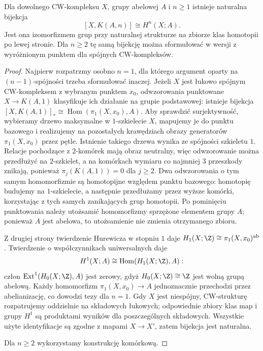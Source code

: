 \begin{twierdzenie}
\label{thm:rep-coho-v6}
Dla dowolnego CW-kompleksu $X$, grupy abelowej $A$ i
$n\ge1$ istnieje naturalna bijekcja
\[
[X,K(A,n)]\cong H^n(X;A).
\]
Jest ona izomorfizmem grup przy naturalnej strukturze
na zbiorze klas homotopii po lewej stronie.
Dla $n\ge2$ tę samą bijekcję można sformułować
w wersji z wyróżnionym punktem dla spójnych CW-kompleksów.
\end{twierdzenie}
\begin{proof}
Najpierw rozpatrzmy osobno $n=1$, dla którego argument
oparty na $(n-1)$-spójności trzeba sformułować inaczej.
Jeżeli $X$ jest łukowo spójnym CW-kompleksem z wybranym
punktem $x_0$, odwzorowania punktowane $X\to K(A,1)$ klasyfikuje
ich działanie na grupie podstawowej: istnieje bijekcja
$[X,K(A,1)]_*\cong\operatorname{Hom}(\pi_1(X,x_0),A)$.
Aby sprawdzić surjektywność, wybieramy drzewo maksymalne w $1$-szkielecie $X$,
mapujemy je do punktu bazowego i realizujemy na pozostałych
krawędziach obrazy generatorów $\pi_1(X,x_0)$ przez pętle.
Istnienie takiego drzewa wynika ze spójności szkieletu $1$.
Relacje pochodzące z $2$-komórek mają obraz neutralny,
więc odwzorowanie można przedłużyć na $2$-szkielet, a na
komórkach wymiaru co najmniej $3$ przeszkody znikają,
ponieważ $\pi_j(K(A,1))=0$ dla $j\ge2$. Dwa odwzorowania o tym
samym homomorfizmie są homotopijne względem punktu
bazowego: homotopię budujemy na $1$-szkielecie,
a następnie przedłużamy przez wyższe komórki,
korzystając z tych samych zanikających grup homotopii.
Po pominięciu punktowania należy utożsamić homomorfizmy
sprzężone elementem grupy $A$; ponieważ $A$ jest abelowa,
to utożsamienie nie zmienia otrzymanego zbioru.

Z drugiej strony twierdzenie Hurewicza w stopniu $1$
daje $H_1(X;\Z)\cong\pi_1(X,x_0)^{\mathrm{ab}}$.
Twierdzenie o współczynnikach uniwersalnych daje
\[H^1(X;A)\cong\operatorname{Hom}(H_1(X;\Z),A):\]
człon $\operatorname{Ext}^1(H_0(X;\Z),A)$ jest zerowy,
gdyż $H_0(X;\Z)\cong\Z$ jest wolną grupą abelową.
Każdy homomorfizm $\pi_1(X,x_0)\to A$ jednoznacznie
przechodzi przez abelianizację, co dowodzi tezy dla
$n=1$. Gdy $X$ jest niespójny, CW-strukturę rozpatrujemy
oddzielnie na składowych łukowych; odpowiednie zbiory
klas map i grupy $H^1$ są produktami wyników dla
poszczególnych składowych. Wszystkie użyte identyfikacje
są zgodne z mapami $X\to X'$, zatem bijekcja jest naturalna.

Dla $n\ge2$ wykorzystamy konstrukcję komórkową.


\end{proof}
